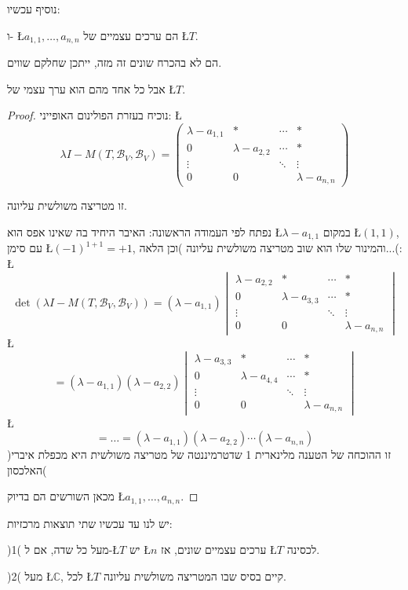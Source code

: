 \documentclass[english,hebrew]{article}
\begin{document}
נוסיף עכשיו:

ו- \L{$a_{1,1},\ldots,a_{n,n}$} הם ערכים עצמיים של \L{$T$}.

הם לא בהכרח שונים זה מזה, ייתכן שחלקם שווים.

אבל כל אחד מהם הוא ערך עצמי של \L{$T$}. 
\begin{proof}
נוכיח בעזרת הפולינום האופייני: \L{%
\[
\lambda I-M\left(T,\mathcal{B}_{V},\mathcal{B}_{V}\right)=\begin{pmatrix}\lambda-a_{1,1} & * & \cdots & *\\
0 & \lambda-a_{2,2} & \cdots & *\\
\vdots &  & \ddots & \vdots\\
0 & 0 &  & \lambda-a_{n,n}
\end{pmatrix}
\]
}%

זו מטריצה משולשית עליונה.

נפתח לפי העמודה הראשונה: האיבר היחיד בה שאינו אפס הוא \L{$\lambda-a_{1,1}$}
במקום \L{$\left(1,1\right)$}, עם סימן \L{$\left(-1\right)^{1+1}=+1$},
והמינור שלו הוא שוב מטריצה משולשית עליונה )וכן הלאה...(: \L{%
\[
\det\left(\lambda I-M\left(T,\mathcal{B}_{V},\mathcal{B}_{V}\right)\right)=\left(\lambda-a_{1,1}\right)\begin{vmatrix}\lambda-a_{2,2} & * & \cdots & *\\
0 & \lambda-a_{3,3} & \cdots & *\\
\vdots &  & \ddots & \vdots\\
0 & 0 &  & \lambda-a_{n,n}
\end{vmatrix}
\]
}%
\L{%
\[
=\left(\lambda-a_{1,1}\right)\left(\lambda-a_{2,2}\right)\begin{vmatrix}\lambda-a_{3,3} & * & \cdots & *\\
0 & \lambda-a_{4,4} & \cdots & *\\
\vdots &  & \ddots & \vdots\\
0 & 0 &  & \lambda-a_{n,n}
\end{vmatrix}
\]
}%
\L{%
\[
=\dots=\left(\lambda-a_{1,1}\right)\left(\lambda-a_{2,2}\right)\cdots\left(\lambda-a_{n,n}\right)
\]
}%
)זו ההוכחה של הטענה מלינארית 1 שדטרמיננטה של מטריצה משולשית היא מכפלת
איברי האלכסון(

מכאן השורשים הם בדיוק \L{$a_{1,1},\ldots,a_{n,n}$}. 
\end{proof}
יש לנו עד עכשיו שתי תוצאות מרכזיות:

)1( מעל כל שדה, אם ל-\L{$T$} יש \L{$n$} ערכים עצמיים שונים, אז \L{$T$}
לכסינה.

)2( מעל \L{$\mathbb{C}$}, לכל \L{$T$} קיים בסיס שבו המטריצה משולשית
עליונה.
\end{document}
